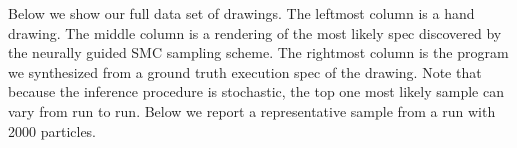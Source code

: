 \documentclass{article}
\begin{document}
Below we show our full data set of drawings. The leftmost column is a hand drawing. The middle column is a rendering of the most likely spec discovered by the neurally guided SMC sampling scheme. The rightmost column is the program we synthesized from a ground truth execution spec of the drawing.
Note that because the inference procedure is stochastic,
the top one most likely sample can vary from run to run.
Below we report a representative sample from a run with 2000 particles.


 



{\small }
 
\end{document}

